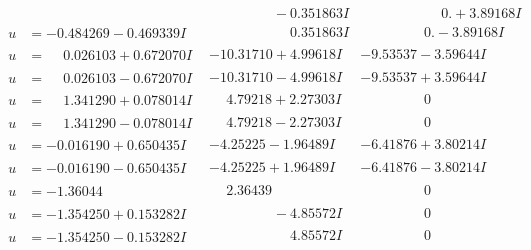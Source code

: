\documentclass[1p]{elsarticle_modified}
\theoremstyle{definition}
\begin{document}
$$\begin{array}{c|c|c}
 & \phantom{-0.000000 } -0.351863 I & \phantom{-0.000000 -}0. + 3.89168 I \\ \hline\begin{aligned}
u &= -0.484269 - 0.469339 I\end{aligned}
 & \phantom{-0.000000 -}0.351863 I & \phantom{-0.000000 } 0. - 3.89168 I \\ \hline\begin{aligned}
u &= \phantom{-}0.026103 + 0.672070 I\end{aligned}
 & -10.31710 + 4.99618 I & -9.53537 - 3.59644 I \\ \hline\begin{aligned}
u &= \phantom{-}0.026103 - 0.672070 I\end{aligned}
 & -10.31710 - 4.99618 I & -9.53537 + 3.59644 I \\ \hline\begin{aligned}
u &= \phantom{-}1.341290 + 0.078014 I\end{aligned}
 & \phantom{-}4.79218 + 2.27303 I & \phantom{-0.000000 } 0 \\ \hline\begin{aligned}
u &= \phantom{-}1.341290 - 0.078014 I\end{aligned}
 & \phantom{-}4.79218 - 2.27303 I & \phantom{-0.000000 } 0 \\ \hline\begin{aligned}
u &= -0.016190 + 0.650435 I\end{aligned}
 & -4.25225 - 1.96489 I & -6.41876 + 3.80214 I \\ \hline\begin{aligned}
u &= -0.016190 - 0.650435 I\end{aligned}
 & -4.25225 + 1.96489 I & -6.41876 - 3.80214 I \\ \hline\begin{aligned}
u &= -1.36044\phantom{ +0.000000I}\end{aligned}
 & \phantom{-}2.36439\phantom{ +0.000000I} & \phantom{-0.000000 } 0 \\ \hline\begin{aligned}
u &= -1.354250 + 0.153282 I\end{aligned}
 & \phantom{-0.000000 } -4.85572 I & \phantom{-0.000000 } 0 \\ \hline\begin{aligned}
u &= -1.354250 - 0.153282 I\end{aligned}
 & \phantom{-0.000000 -}4.85572 I & \phantom{-0.000000 } 0 \\ \hline\begin{aligned}

\end{aligned}
\end{array}$$
\end{document}
